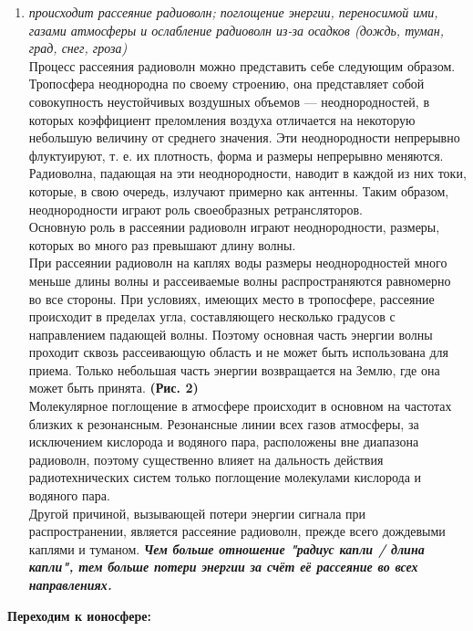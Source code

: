 \documentclass[a4paper,12pt]{article} %
\begin{document}
\begin{enumerate}
\item \textsl{происходит рассеяние радиоволн; поглощение энергии, переносимой ими, газами атмосферы и ослабление радиоволн из-за осадков (дождь, туман, град, снег, гроза)} \\
Процесс рассеяния радиоволн можно представить себе следующим образом. Тропосфера неоднородна по своему строению, она представляет собой совокупность неустойчивых воздушных объемов — неоднородностей, в которых коэффициент преломления воздуха отличается на некоторую небольшую величину от среднего значения. Эти неоднородности непрерывно флуктуируют, т. е. их плотность, форма и размеры непрерывно меняются. Радиоволна, падающая на эти неоднородности, наводит в каждой из них токи, которые, в свою очередь, излучают примерно как антенны. Таким образом, неоднородности играют роль своеобразных ретрансляторов. \\
Основную роль в рассеянии радиоволн играют неоднородности, размеры, которых во много раз превышают длину волны. \\
При рассеянии радиоволн на каплях воды размеры неоднородностей много меньше длины волны и рассеиваемые волны распространяются равномерно во все стороны. При условиях, имеющих место в тропосфере, рассеяние происходит в пределах угла, составляющего несколько градусов с направлением падающей волны. Поэтому основная часть энергии волны проходит сквозь рассеивающую область и не может быть использована для приема. Только небольшая часть энергии возвращается на Землю, где она может быть принята. \textbf{(Рис. 2)} \\
Молекулярное поглощение в атмосфере происходит в основном на частотах близких к резонансным. Резонансные линии всех газов атмосферы, за исключением кислорода и водяного пара, расположены вне диапазона радиоволн, поэтому существенно влияет на дальность действия радиотехнических систем только поглощение молекулами кислорода и водяного пара. \\
Другой причиной, вызывающей потери энергии сигнала при распространении, является рассеяние радиоволн, прежде всего дождевыми каплями и туманом. \textbf{\textsl{Чем больше отношение "радиус капли / длина капли", тем больше потери энергии за счёт её рассеяние во всех направлениях.}}
\end{enumerate}

\begin{flushleft}
\textbf{Переходим к ионосфере:}
\end{flushleft}
\end{document}
